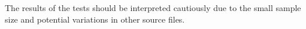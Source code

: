 The results of the tests should be interpreted cautiously due to the small sample size and potential variations in other source files.




